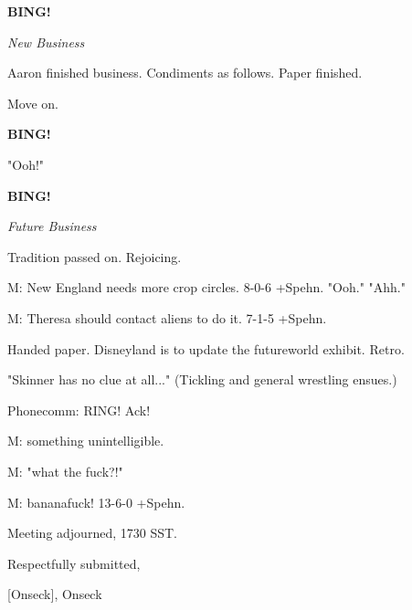 \documentclass[12pt]{article}
\newcommand{\bing}{{\bf BING!} }
\newcommand{\goto}[1]{\bing \vskip 12pt \centerline{{\em{#1}}}}
\begin{document}
\goto{New Business}

Aaron finished business. Condiments as follows. Paper finished.

Move on.

\bing

"Ooh!"

\goto{Future Business}

Tradition passed on. Rejoicing.

M: New England needs more crop circles. 8-0-6 +Spehn. "Ooh." "Ahh."

M: Theresa should contact aliens to do it. 7-1-5 +Spehn.

Handed paper. Disneyland is to update the futureworld exhibit. Retro.

"Skinner has no clue at all..." (Tickling and general wrestling ensues.)

Phonecomm: RING! Ack!

M: something unintelligible.

M: "what the fuck?!"

M: bananafuck! 13-6-0 +Spehn.

\vspace{12pt}

\noindent
Meeting adjourned, 1730 SST.

\vspace{18pt}

\centerline{Respectfully submitted,}
\centerline{[Onseck], Onseck}
\end{document}
